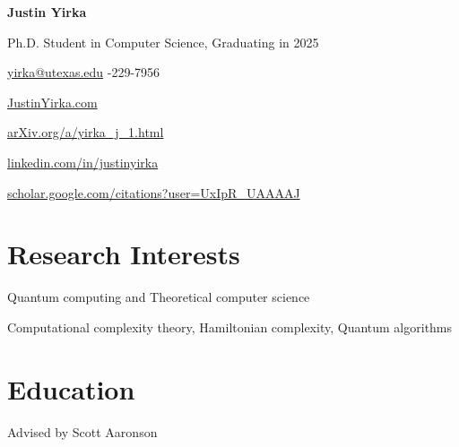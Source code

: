 \documentclass[11pt,letterpaper,serif]{moderncv}
\begin{document}
\pagestyle{normal}


\thispagestyle{firstpage}

\begin{center}
	{\LARGE\textbf{Justin Yirka}}

	\smallskip{}

	Ph.D. Student in Computer Science, Graduating in 2025

	\medskip{}

	\href{mailto:yirka@utexas.edu}{yirka@utexas.edu}
	-229-7956

	\href{https://www.justinyirka.com}{JustinYirka.com}

	\medskip{}

	\href{https://arxiv.org/a/yirka_j_1.html}{arXiv.org/a/yirka\_j\_1.html}

	\faLinkedin{} \href{https://www.linkedin.com/in/justinyirka/}{linkedin.com/in/justinyirka}

	\faGraduationCap{} \href{https://scholar.google.com/citations?user=UxIpR_UAAAAJ}{scholar.google.com/citations?user=UxIpR\_UAAAAJ}
\end{center}


\setlength{\parskip}{0em}

\section{Research Interests}
Quantum computing and Theoretical computer science

\qquad Computational complexity theory, Hamiltonian complexity, Quantum algorithms


\section{Education}


{
		\normalsize
		\begin{adjustwidth}{.25in}{}
			Advised by Scott Aaronson
		\end{adjustwidth}
}
\end{document}

